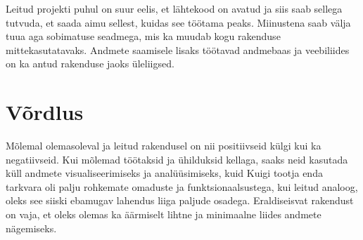 Leitud projekti puhul on suur eelis, et lähtekood on avatud ja siis saab sellega tutvuda, et saada aimu sellest, kuidas see töötama peaks.
Miinustena saab välja tuua aga sobimatuse seadmega, mis ka muudab kogu rakenduse mittekasutatavaks.
Andmete saamisele lisaks töötavad andmebaas ja veebiliides on ka antud rakenduse jaoks üleliigsed.


\section{Võrdlus}
Mõlemal olemasoleval ja leitud rakendusel on nii positiivseid külgi kui ka negatiivseid.
Kui mõlemad töötaksid ja ühilduksid kellaga, saaks neid kasutada küll andmete visualiseerimiseks ja analüüsimiseks, kuid 
Kuigi tootja enda tarkvara oli palju rohkemate omaduste ja funktsionaalsustega, kui leitud analoog, oleks see siiski ebamugav lahendus liiga paljude osadega.
Eraldiseisvat rakendust on vaja, et oleks olemas ka äärmiselt lihtne ja minimaalne liides andmete nägemiseks.
